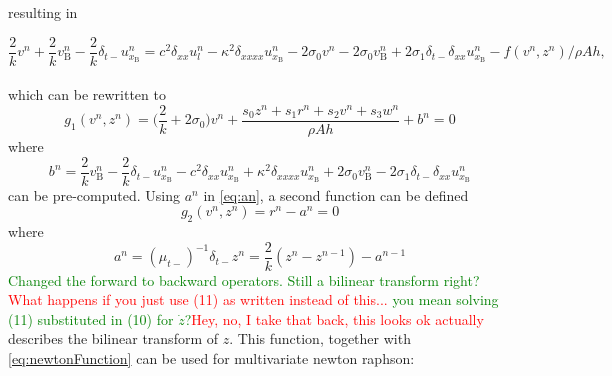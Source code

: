 \documentclass{article}
\def\SBcomment[#1]{\textcolor{Red}{#1}}
\def\SWcomment[#1]{\textcolor{Green}{#1}}
\begin{document}
\noindent resulting in 

\begin{equation}
\label{eq:stiffStringFDS}
\frac{2}{k}v^n + \frac{2}{k}v_\text{B}^n - \frac{2}{k}\delta_{t-}u_{x_\text{B}}^n =c^2 \delta_{xx} u_l^n -\kappa^2\delta_{xxxx} u_{x_\text{B}}^n - 2\sigma_0v^n - 2\sigma_0v_\text{B}^n
+ 2\sigma_1\delta_{t-}\delta_{xx}u_{x_\text{B}}^n - f(v^n, z^n)/\rho Ah,
\end{equation}
\\
which can be rewritten to
\begin{equation}\label{eq:newtonFunction}
\boxed{g_1(v^n, z^n) = \Big(\frac{2}{k} + 2\sigma_0\Big)v^n + \frac{s_0z^n+s_1r^n+s_2v^n+s_3w^n}{\rho A h} + b^n = 0} \end{equation}
where
\begin{equation}
    b^n = \frac{2}{k}v_\text{B}^n-\frac{2}{k}\delta_{t-}u_{x_\text{B}}^n - c^2 \delta_{xx} u_{x_\text{B}}^n +\kappa^2\delta_{xxxx} u_{x_\text{B}}^n + 2\sigma_0v_\text{B}^n
- 2\sigma_1\delta_{t-}\delta_{xx}u_{x_\text{B}}^n
\end{equation}
can be pre-computed. Using $a^n$ in \eqref{eq:an}, a second function can be defined
\begin{equation}
   \boxed{g_2(v^n,z^n) = r^n -  a^n = 0}
\end{equation}
where
\begin{equation}\label{eq:an}
    a^n = (\mu_{t-})^{-1}\delta_{t-}z^n = \frac{2}{k}(z^n-z^{n-1})-a^{n-1}
\end{equation} \SWcomment[Changed the forward to backward operators. Still a bilinear transform right?]{}
\SBcomment[What happens if you just use (11) as written instead of this...] \SWcomment[you mean solving (11) substituted in (10) for $\dot{z}$?]{}\SBcomment[Hey, no, I take that back, this looks ok actually]
describes the bilinear transform of $z$. 
This function, together with \eqref{eq:newtonFunction} can be used for multivariate newton raphson:
\end{document}
